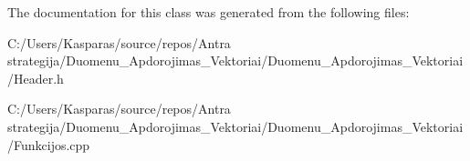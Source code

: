 The documentation for this class was generated from the following files\+:\begin{DoxyCompactItemize}
\item 
C\+:/\+Users/\+Kasparas/source/repos/\+Antra strategija/\+Duomenu\+\_\+\+Apdorojimas\+\_\+\+Vektoriai/\+Duomenu\+\_\+\+Apdorojimas\+\_\+\+Vektoriai/Header.\+h\item 
C\+:/\+Users/\+Kasparas/source/repos/\+Antra strategija/\+Duomenu\+\_\+\+Apdorojimas\+\_\+\+Vektoriai/\+Duomenu\+\_\+\+Apdorojimas\+\_\+\+Vektoriai/Funkcijos.\+cpp\end{DoxyCompactItemize}
